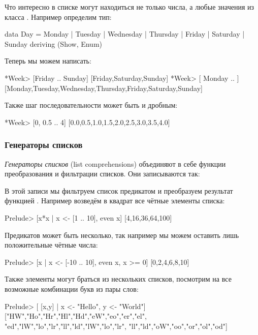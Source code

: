 Что интересно в списке могут находиться не только числа, а любые
значения из класса . Например определим тип:


\begin{code}
data Day    = Monday | Tuesday | Wednesday | Thursday
            | Friday | Saturday | Sunday
            deriving (Show, Enum)
\end{code}

Теперь мы можем написать:


\begin{code}
*Week> [Friday .. Sunday]
[Friday,Saturday,Sunday]
*Week> [ Monday .. ]
[Monday,Tuesday,Wednesday,Thursday,Friday,Saturday,Sunday]
\end{code}

Также шаг последовательности может быть и дробным:


\begin{code}
*Week> [0, 0.5 .. 4]
[0.0,0.5,1.0,1.5,2.0,2.5,3.0,3.5,4.0]
\end{code}

\subsubsection{Генераторы списков}

 \emph{Генераторы списков} (list
comprehensions) объединяют в себе функции преобразования и фильтрации
списков. Они записываются так:


\begin{code}
[ f x | x <- list, p x]
\end{code}

В этой записи мы фильтруем список  предикатом  и
преобразуем результат функцией . Например возведём в квадрат все
чётные элементы списка:


\begin{code}
Prelude> [x*x | x <- [1 .. 10], even x]
[4,16,36,64,100]
\end{code}

Предикатов может быть несколько, так например мы можем оставить лишь
положительные чётные числа:


\begin{code}
Prelude> [x | x <- [-10 .. 10], even x, x >= 0]
[0,2,4,6,8,10]
\end{code}

Также элементы могут браться из нескольких списков, посмотрим на все
возможные комбинации букв из пары слов:


\begin{code}
Prelude> [ [x,y] | x <- "Hello", y <- "World"]
["HW","Ho","Hr","Hl","Hd","eW","eo","er","el",
 "ed","lW","lo","lr","ll","ld","lW","lo","lr",
 "ll","ld","oW","oo","or","ol","od"]
\end{code}

